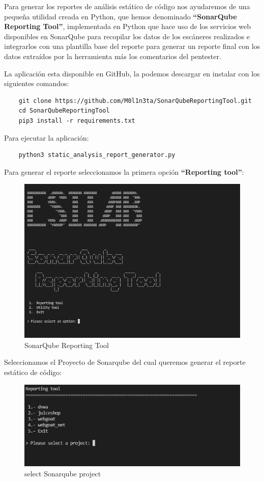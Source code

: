 Para generar los reportes de análisis estático de código nos ayudaremos de una pequeña utilidad creada en Python, que hemos 
denominado \textbf{“SonarQube Reporting Tool”}, implementada en Python que hace uso de los servicios web disponibles en SonarQube
para recopilar los datos de los escáneres realizados e integrarlos con una plantilla base del 
reporte para generar un reporte final con los datos extraídos por la herramienta más los comentarios del pentester.

La aplicación esta disponible en GitHub, la podemos descargar en instalar con los siguientes comandos:
\begin{verbatim}
    git clone https://github.com/M0l1n3ta/SonarQubeReportingTool.git
    cd SonarQubeReportingTool
    pip3 install -r requirements.txt
\end{verbatim}

Para ejecutar la aplicación:
\begin{verbatim}
    python3 static_analysis_report_generator.py
\end{verbatim}

Para generar el reporte seleccionamos la primera opción \textbf{“Reporting tool”}:
\begin{figure}[h!]  
    \includegraphics[width=\linewidth]{./imagenes/017_SonarQubeReportTool_1.png}
    \caption{SonarQube Reporting Tool}  
    \label{fig:15 - SonarQube Reporting tool}
\end{figure}

Seleccionamos el Proyecto de Sonarqube del cual queremos generar el reporte estático de código:
\begin{figure}[h!]  
    \includegraphics[width=\linewidth]{./imagenes/017_SonarQubeReportTool_2.png}
    \caption{select Sonarqube project}  
    \label{fig:16}
\end{figure}

